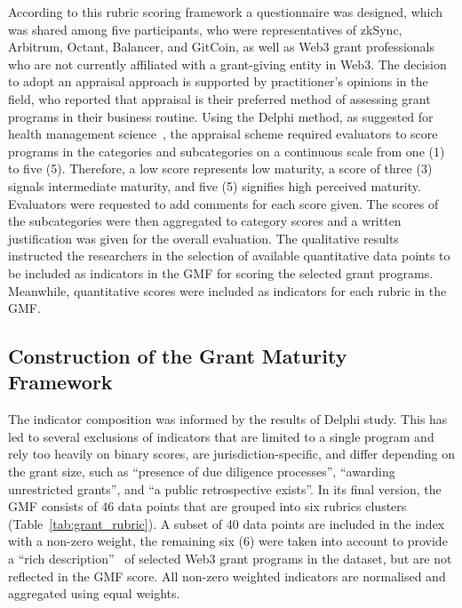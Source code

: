 \documentclass[conference]{IEEEtran}
\begin{document}
According to this rubric scoring framework a questionnaire was designed, which was shared among five participants, who were representatives of zkSync, Arbitrum, Octant, Balancer, and GitCoin, as well as Web3 grant professionals who are not currently affiliated with a grant-giving entity in Web3. The decision to adopt an appraisal approach is supported by practitioner's opinions in the field, who reported that appraisal is their preferred method of assessing grant programs in their business routine. Using the Delphi method, as suggested for health management science~\cite{van_ede_assembling_2024}, the appraisal scheme required evaluators to score programs in the categories and subcategories on a continuous scale from one (1) to five (5). Therefore, a low score represents low maturity, a score of three (3) signals intermediate maturity, and five (5) signifies high perceived maturity. Evaluators were requested to add comments for each score given. The scores of the subcategories were then aggregated to category scores and a written justification was given for the overall evaluation. The qualitative results instructed the researchers in the selection of available quantitative data points to be included as indicators in the GMF for scoring the selected grant programs. Meanwhile, quantitative scores were included as indicators for each rubric in the GMF.

\subsection{Construction of the Grant Maturity Framework}\label{sec_3.2}

The indicator composition was informed by the results of Delphi study. This has led to several exclusions of indicators that are limited to a single program and rely too heavily on binary scores, are jurisdiction-specific, and differ depending on the grant size, such as ``presence of due diligence processes'', ``awarding unrestricted grants'', and ``a public retrospective exists''. In its final version, the GMF consists of 46 data points that are grouped into six rubrics clusters (Table~\ref{tab:grant_rubric}). A subset of 40 data points are included in the index with a non-zero weight, the remaining six (6) were taken into account to provide a ``rich description''~\cite[p.~197]{mcbride_sailing_2019} of selected Web3 grant programs in the dataset, but are not reflected in the GMF score. All non-zero weighted indicators are normalised and aggregated using equal weights.
\end{document}
